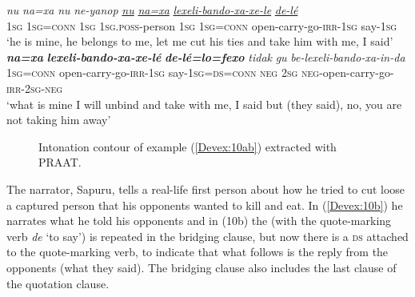 \documentclass[output=paper]{LSP/langsci}
\begin{document}
\begin{exe}
\ex \label{Devex:10ab}
\begin{xlist}
\ex \label{Devex:10a}		
\gll \textit{nu}	\textit{na=xa} \textit{nu} \textit{ne-yanop} \underline{\textit{nu}} \underline{\textit{na=xa}} \underline{\textit{lexeli-bando-xa-xe-le}} \underline{\textit{de-lé}}\\
\textsc{1sg}	\textsc{1sg=conn} \textsc{1sg} \textsc{1sg.poss}-person	\textsc{1sg}	\textsc{1sg=conn} open-carry-go-\textsc{irr-1sg} say-\textsc{1sg}\\
\glt `he is mine, he belongs to me, let me cut his ties and take him with me, I said'\\

\ex \label{Devex:10b}		
\gll \textbf{\textit{na=xa}} \textbf{\textit{lexeli-bando-xa-xe-lé}}	\textbf{\textit{de-lé=lo=fexo}} \textit{tidak}	\textit{gu} \textit{be-lexeli-bando-xa-in-da}\\	
\textsc{1sg=conn} open-carry-go-\textsc{irr-1sg} say-\textsc{1sg=ds=conn} \textsc{neg} \textsc{2sg} \textsc{neg}-open-carry-go-\textsc{irr-2sg-neg}\\
\glt `what is mine I will unbind and take with me, I said but (they said), no, you are not taking him away'\\
\end{xlist}
\end{exe}


\begin{figure}[ht]
\caption{Intonation contour of example (\ref{Devex:10ab}) extracted with PRAAT. \label{DevF1}}
\end{figure}


The narrator, Sapuru, tells a real-life first person  about how he tried to cut loose a captured person that his opponents wanted to kill and eat. In (\ref{Devex:10b}) he narrates what he told his opponents and in (10b) the  (with the quote-marking verb \textit{de} `to say') is repeated in the bridging clause, but now there is a \textsc{ds}  attached to the quote-marking verb, to indicate that what follows is the reply from the opponents (what they said). The bridging clause also includes the last clause of the quotation clause. 
\end{document}
